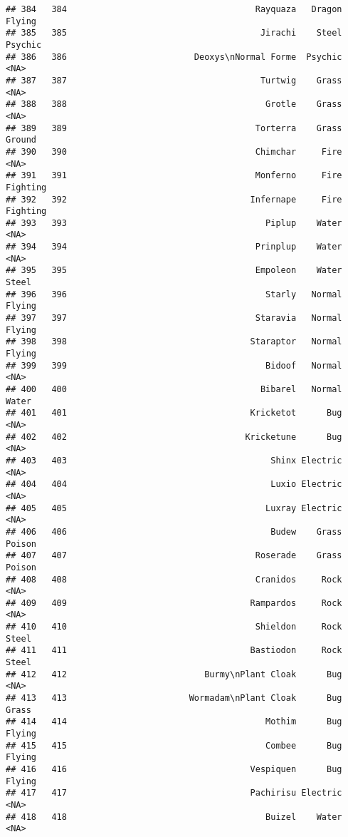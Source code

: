 \documentclass[
]{article}
\begin{document}
\begin{verbatim}
## 384   384                                     Rayquaza   Dragon   Flying
## 385   385                                      Jirachi    Steel  Psychic
## 386   386                         Deoxys\nNormal Forme  Psychic     <NA>
## 387   387                                      Turtwig    Grass     <NA>
## 388   388                                       Grotle    Grass     <NA>
## 389   389                                     Torterra    Grass   Ground
## 390   390                                     Chimchar     Fire     <NA>
## 391   391                                     Monferno     Fire Fighting
## 392   392                                    Infernape     Fire Fighting
## 393   393                                       Piplup    Water     <NA>
## 394   394                                     Prinplup    Water     <NA>
## 395   395                                     Empoleon    Water    Steel
## 396   396                                       Starly   Normal   Flying
## 397   397                                     Staravia   Normal   Flying
## 398   398                                    Staraptor   Normal   Flying
## 399   399                                       Bidoof   Normal     <NA>
## 400   400                                      Bibarel   Normal    Water
## 401   401                                    Kricketot      Bug     <NA>
## 402   402                                   Kricketune      Bug     <NA>
## 403   403                                        Shinx Electric     <NA>
## 404   404                                        Luxio Electric     <NA>
## 405   405                                       Luxray Electric     <NA>
## 406   406                                        Budew    Grass   Poison
## 407   407                                     Roserade    Grass   Poison
## 408   408                                     Cranidos     Rock     <NA>
## 409   409                                    Rampardos     Rock     <NA>
## 410   410                                     Shieldon     Rock    Steel
## 411   411                                    Bastiodon     Rock    Steel
## 412   412                           Burmy\nPlant Cloak      Bug     <NA>
## 413   413                        Wormadam\nPlant Cloak      Bug    Grass
## 414   414                                       Mothim      Bug   Flying
## 415   415                                       Combee      Bug   Flying
## 416   416                                    Vespiquen      Bug   Flying
## 417   417                                    Pachirisu Electric     <NA>
## 418   418                                       Buizel    Water     <NA>

\end{verbatim}
\end{document}
